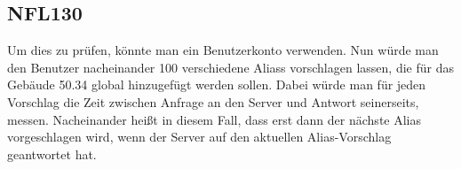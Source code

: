 \subsection*{NFL130}
Um dies zu prüfen, könnte man ein \Gls{Benutzer}konto verwenden. Nun würde man den \Gls{Benutzer} nacheinander 100 verschiedene \Glspl{Alias} vorschlagen lassen, die für das Gebäude 50.34 \gls{global} hinzugefügt werden sollen. Dabei würde man für jeden Vorschlag die Zeit zwischen Anfrage an den \Gls{Server} und Antwort seinerseits, messen. Nacheinander heißt in diesem Fall, dass erst dann der nächste \Gls{Alias} vorgeschlagen wird, wenn der \Gls{Server} auf den aktuellen \Gls{Alias-Vorschlag} geantwortet hat.